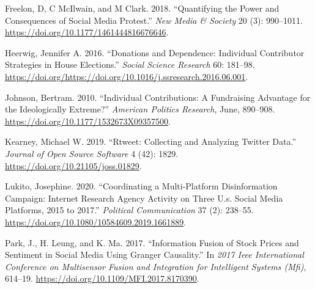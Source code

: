 \documentclass[12pt,]{article}
\begin{document}
\leavevmode\hypertarget{ref-freelon2018}{}%
Freelon, D, C McIlwain, and M Clark. 2018. ``Quantifying the Power and
Consequences of Social Media Protest.'' \emph{New Media \& Society} 20
(3): 990--1011. \url{https://doi.org/10.1177/1461444816676646}.

\leavevmode\hypertarget{ref-heerwig2016}{}%
Heerwig, Jennifer A. 2016. ``Donations and Dependence: Individual
Contributor Strategies in House Elections.'' \emph{Social Science
Research} 60: 181--98.
\url{https://doi.org/https://doi.org/10.1016/j.ssresearch.2016.06.001}.

\leavevmode\hypertarget{ref-johnson2010}{}%
Johnson, Bertram. 2010. ``Individual Contributions: A Fundraising
Advantage for the Ideologically Extreme?'' \emph{American Politics
Research}, June, 890--908.
\url{https://doi.org/10.1177/1532673X09357500}.

\leavevmode\hypertarget{ref-rtweet}{}%
Kearney, Michael W. 2019. ``Rtweet: Collecting and Analyzing Twitter
Data.'' \emph{Journal of Open Source Software} 4 (42): 1829.
\url{https://doi.org/10.21105/joss.01829}.

\leavevmode\hypertarget{ref-lukito2020}{}%
Lukito, Josephine. 2020. ``Coordinating a Multi-Platform Disinformation
Campaign: Internet Research Agency Activity on Three U.s. Social Media
Platforms, 2015 to 2017.'' \emph{Political Communication} 37 (2):
238--55. \url{https://doi.org/10.1080/10584609.2019.1661889}.

\leavevmode\hypertarget{ref-park2017}{}%
Park, J., H. Leung, and K. Ma. 2017. ``Information Fusion of Stock
Prices and Sentiment in Social Media Using Granger Causality.'' In
\emph{2017 Ieee International Conference on Multisensor Fusion and
Integration for Intelligent Systems (Mfi)}, 614--19.
\url{https://doi.org/10.1109/MFI.2017.8170390}.





\newpage
\singlespacing 
\end{document}
